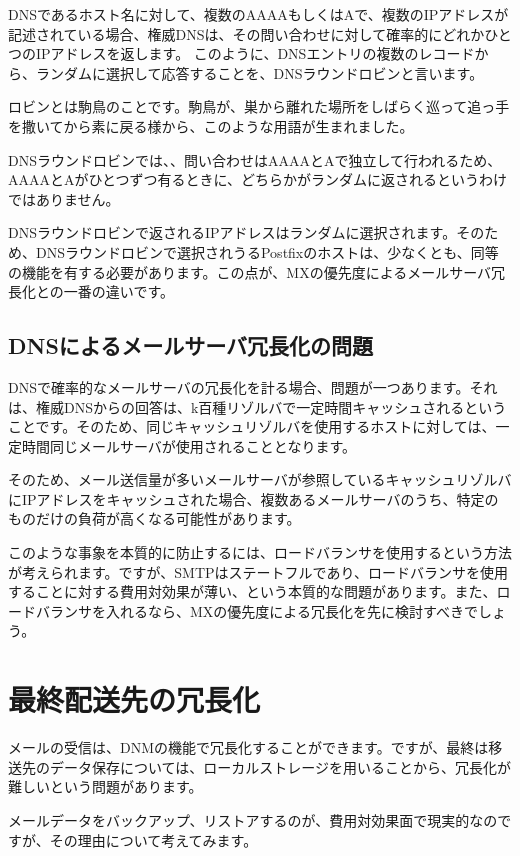 DNSであるホスト名に対して、複数のAAAAもしくはAで、複数のIPアドレスが記述されている場合、権威DNSは、その問い合わせに対して確率的にどれかひとつのIPアドレスを返します。
このように、DNSエントリの複数のレコードから、ランダムに選択して応答することを、DNSラウンドロビンと言います。

ロビンとは駒鳥のことです。駒鳥が、巣から離れた場所をしばらく巡って追っ手を撒いてから素に戻る様から、このような用語が生まれました。

DNSラウンドロビンでは、、問い合わせはAAAAとAで独立して行われるため、AAAAとAがひとつずつ有るときに、どちらかがランダムに返されるというわけではありません。

DNSラウンドロビンで返されるIPアドレスはランダムに選択されます。そのため、DNSラウンドロビンで選択されうるPostfixのホストは、少なくとも、同等の機能を有する必要があります。この点が、MXの優先度によるメールサーバ冗長化との一番の違いです。

\subsection{DNSによるメールサーバ冗長化の問題}

DNSで確率的なメールサーバの冗長化を計る場合、問題が一つあります。それは、権威DNSからの回答は、k百種リゾルバで一定時間キャッシュされるということです。そのため、同じキャッシュリゾルバを使用するホストに対しては、一定時間同じメールサーバが使用されることとなります。

そのため、メール送信量が多いメールサーバが参照しているキャッシュリゾルバにIPアドレスをキャッシュされた場合、複数あるメールサーバのうち、特定のものだけの負荷が高くなる可能性があります。

このような事象を本質的に防止するには、ロードバランサを使用するという方法が考えられます。ですが、SMTPはステートフルであり、ロードバランサを使用することに対する費用対効果が薄い、という本質的な問題があります。また、ロードバランサを入れるなら、MXの優先度による冗長化を先に検討すべきでしょう。


\section{最終配送先の冗長化}

メールの受信は、DNMの機能で冗長化することができます。ですが、最終は移送先のデータ保存については、ローカルストレージを用いることから、冗長化が難しいという問題があります。

メールデータをバックアップ、リストアするのが、費用対効果面で現実的なのですが、その理由について考えてみます。

